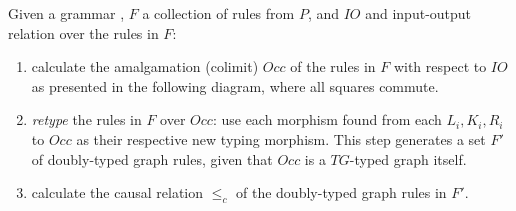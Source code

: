 \begin{definition}\label{def:ogg-construction} Given a grammar \graphGrammar{}, $F$ a collection of rules from $P$, and $IO$ and input-output relation over the rules in $F$:

\begin{enumerate}
  \item\label{enum:construction-colimit} calculate the amalgamation (colimit) $Occ$ of the rules in $F$ with respect to $IO$ as presented in the following diagram, where all squares commute.

\hfill\break


\item \emph{retype} the rules in $F$ over $Occ$: use each morphism found from each $L_i, K_i, R_i$ to $Occ$ as their respective new typing morphism. This step generates a set $F'$ of doubly-typed graph rules, given that $Occ$ is a $TG$-typed graph itself.

\item calculate the causal relation $\leq_{c}$ of the doubly-typed graph rules in $F'$.


\end{enumerate}
\end{definition}

